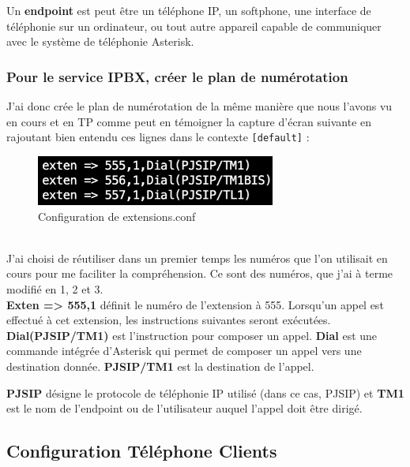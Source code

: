 \documentclass[12pt, a4paper]{article}
\begin{document}
	Un \textbf{endpoint} est peut être un téléphone IP, un softphone, 
	une interface de téléphonie sur un ordinateur, ou tout autre appareil 
	capable de communiquer avec le système de téléphonie Asterisk.
	
	\newpage
	\subsubsection{Pour le service IPBX, créer le plan de numérotation}
	J'ai donc crée le plan de numérotation de la même manière que nous l'avons vu en cours
	et en TP comme peut en témoigner la capture d'écran suivante en rajoutant bien 
	entendu ces lignes dans le contexte \texttt{[default]} :
	\begin{figure}[h]
		\centering
		\includegraphics[width=0.7\textwidth]{img/extensions.png}
		\caption{Configuration de extensions.conf}
		\label{fig:ext}
	\end{figure}\\
	J'ai choisi de réutiliser dans un premier temps les numéros que l'on utilisait
	en cours pour me faciliter la compréhension. Ce sont des numéros, que j'ai à terme 
	modifié en 1, 2 et 3.\\

	\textbf{Exten => 555,1} définit le numéro de l'extension à 555. Lorsqu'un 
	appel est effectué à cet extension, les instructions suivantes seront 
	exécutées. \textbf{Dial(PJSIP/TM1)} est l'instruction pour composer un 
	appel. \textbf{Dial} est une commande intégrée d'Asterisk qui permet de 
	composer un appel vers une destination donnée. \textbf{PJSIP/TM1} est la 
	destination de l'appel.
	
	\textbf{PJSIP} désigne le protocole de téléphonie IP utilisé 
	(dans ce cas, PJSIP) et \textbf{TM1} est le nom de l'endpoint ou 
	de l'utilisateur auquel l'appel doit être dirigé.

\subsection{Configuration Téléphone Clients}
\end{document}
